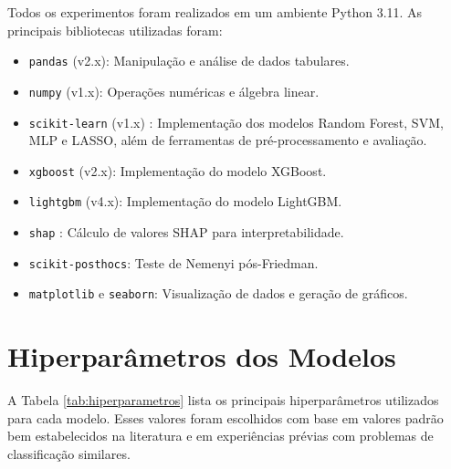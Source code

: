 \documentclass[12pt, a4paper, oneside]{report}
\begin{document}
Todos os experimentos foram realizados em um ambiente Python 3.11. As principais bibliotecas utilizadas foram:

\begin{itemize}
    \item \texttt{pandas} (v2.x): Manipulação e análise de dados tabulares.
    \item \texttt{numpy} (v1.x): Operações numéricas e álgebra linear.
    \item \texttt{scikit-learn} (v1.x) \cite{pedregosa2011}: Implementação dos modelos Random Forest, SVM, MLP e LASSO, além de ferramentas de pré-processamento e avaliação.
    \item \texttt{xgboost} (v2.x): Implementação do modelo XGBoost.
    \item \texttt{lightgbm} (v4.x): Implementação do modelo LightGBM.
    \item \texttt{shap} \cite{lundberg2017}: Cálculo de valores SHAP para interpretabilidade.
    \item \texttt{scikit-posthocs}: Teste de Nemenyi pós-Friedman.
    \item \texttt{matplotlib} e \texttt{seaborn}: Visualização de dados e geração de gráficos.
\end{itemize}

\section{Hiperparâmetros dos Modelos}

A Tabela \ref{tab:hiperparametros} lista os principais hiperparâmetros utilizados para cada modelo. Esses valores foram escolhidos com base em valores padrão bem estabelecidos na literatura e em experiências prévias com problemas de classificação similares.
\end{document}
